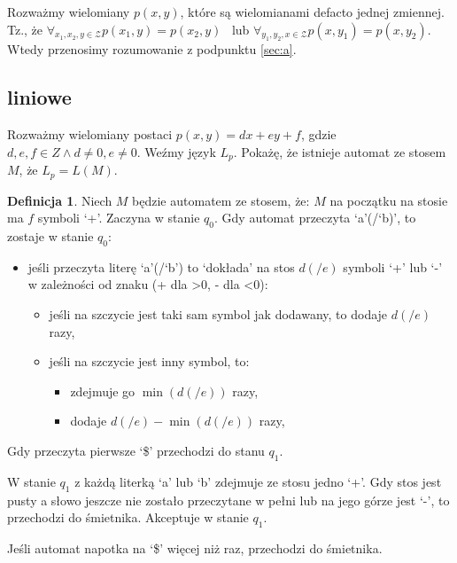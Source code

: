 \documentclass{article}
\theoremstyle{definition}
\newtheorem{definition}{Definicja}[section]
\theoremstyle{remark}
\begin{document}
Rozważmy wielomiany \(p(x,y)\), które są wielomianami defacto jednej zmiennej. Tz., że
\(\forall_{x_1,x_2,y \in \mathcal{Z}} p(x_1,y)=p(x_2,y)\) \ 
lub \(\forall_{y_1,y_2,x \in \mathcal{Z}} p(x,y_1)=p(x,y_2)\). Wtedy przenosimy rozumowanie z podpunktu \ref{sec:a}.

\subsection{liniowe}
Rozważmy wielomiany postaci \(p(x,y)=dx + ey + f\), gdzie \(d,e,f \in Z \land d \neq 0, e \neq 0\).
Weźmy język \(L_p\). Pokażę, że istnieje automat ze stosem \(M\),
że \(L_p = L(M)\).

\begin{definition}
    Niech \(M\) będzie automatem ze stosem, że:
    \(M\) na początku na stosie ma \(f\) symboli `+'.
    Zaczyna w stanie \(q_0\).
    Gdy automat przeczyta `a'(/`b)', to zostaje w stanie \(q_0\):
    \begin{itemize}
        \item jeśli przeczyta literę `a'(/`b') to `dokłada' na stos \(d(/e)\) symboli `+' lub `-' w zależności od znaku (+ dla >0, - dla <0):
        \begin{itemize}
            \item jeśli na szczycie jest taki sam symbol jak dodawany, to dodaje \(d(/e)\) razy,
            \item jeśli na szczycie jest inny symbol, to:
            \begin{itemize}
                \item zdejmuje go \(\min(d(/e))\) razy,
                \item dodaje \(d(/e) - \min(d(/e))\) razy,
            \end{itemize}
        \end{itemize}
    \end{itemize}

    Gdy przeczyta pierwsze `\$' przechodzi do stanu \(q_1\).

    W stanie \(q_1\) z każdą literką `a' lub `b' zdejmuje ze stosu jedno `+'.
    Gdy stos jest pusty a słowo jeszcze nie zostało przeczytane w pełni lub na jego górze jest `-',
    to przechodzi do śmietnika.
    Akceptuje w stanie \(q_1\).

    Jeśli automat napotka na `\$' więcej niż raz, przechodzi do śmietnika.
\end{definition}
\end{document}
